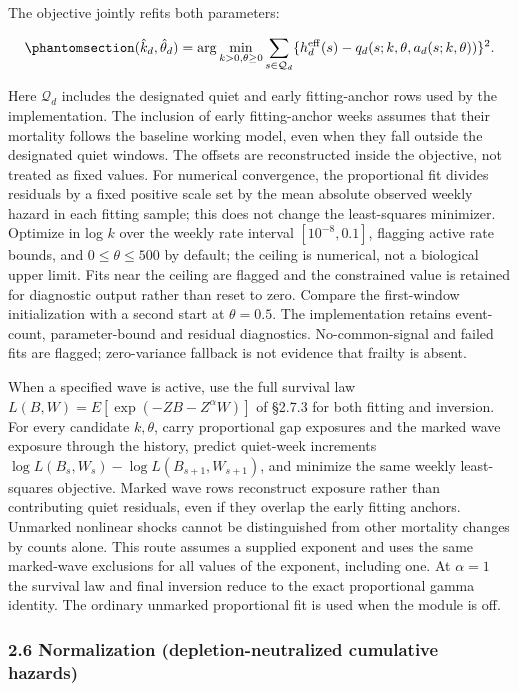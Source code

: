 \documentclass[
]{article}
\begin{document}
The objective jointly refits both parameters:

\begin{equation}\protect\phantomsection\label{eq:nls-objective}{(\hat k_d,\hat\theta_d)=\arg\min_{k>0,\theta\ge0}
\sum_{s\in\mathcal Q_d}\{h_d^{\rm eff}(s)-q_d(s;k,\theta,a_d(s;k,\theta))\}^2 .}\end{equation}

Here \(\mathcal Q_d\) includes the designated quiet and early fitting-anchor rows used by the implementation. The inclusion of early fitting-anchor weeks assumes that their mortality follows the baseline working model, even when they fall outside the designated quiet windows. The offsets are reconstructed inside the objective, not treated as fixed values. For numerical convergence, the proportional fit divides residuals by a fixed positive scale set by the mean absolute observed weekly hazard in each fitting sample; this does not change the least-squares minimizer. Optimize in log \(k\) over the weekly rate interval \([10^{-8},0.1]\), flagging active rate bounds, and \(0\le\theta\le500\) by default; the ceiling is numerical, not a biological upper limit. Fits near the ceiling are flagged and the constrained value is retained for diagnostic output rather than reset to zero. Compare the first-window initialization with a second start at \(\theta=0.5\). The implementation retains event-count, parameter-bound and residual diagnostics. No-common-signal and failed fits are flagged; zero-variance fallback is not evidence that frailty is absent.

When a specified wave is active, use the full survival law \(L(B,W)=E[\exp(-ZB-Z^\alpha W)]\) of §2.7.3 for both fitting and inversion. For every candidate \(k,\theta\), carry proportional gap exposures and the marked wave exposure through the history, predict quiet-week increments \(\log L(B_s,W_s)-\log L(B_{s+1},W_{s+1})\), and minimize the same weekly least-squares objective. Marked wave rows reconstruct exposure rather than contributing quiet residuals, even if they overlap the early fitting anchors. Unmarked nonlinear shocks cannot be distinguished from other mortality changes by counts alone. This route assumes a supplied exponent and uses the same marked-wave exclusions for all values of the exponent, including one. At \(\alpha=1\) the survival law and final inversion reduce to the exact proportional gamma identity. The ordinary unmarked proportional fit is used when the module is off.

\subsubsection{2.6 Normalization (depletion-neutralized cumulative hazards)}\label{normalization-depletion-neutralized-cumulative-hazards}
\end{document}
